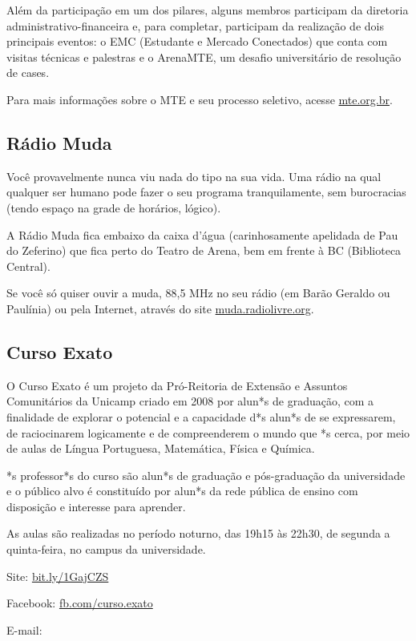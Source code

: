 Além da participação em um dos pilares, alguns membros participam da diretoria
administrativo-financeira e, para completar, participam da realização de dois
principais eventos: o EMC (Estudante e Mercado Conectados) que conta com visitas
técnicas e palestras e o ArenaMTE, um desafio universitário de resolução de
cases.

Para mais informações sobre o MTE e seu processo seletivo, acesse
\url{mte.org.br}.

\subsection{Rádio Muda}

Você provavelmente nunca viu nada do tipo na sua vida. Uma rádio na qual
qualquer ser humano pode fazer o seu programa tranquilamente, sem burocracias
(tendo espaço na grade de horários, lógico).

A Rádio Muda fica embaixo da caixa d'água (carinhosamente apelidada de Pau do
Zeferino) que fica perto do Teatro de Arena, bem em frente à BC (Biblioteca
Central).

Se você só quiser ouvir a muda, 88,5 MHz no seu rádio (em Barão Geraldo ou
Paulínia) ou pela Internet, através do site \url{muda.radiolivre.org}.

\subsection{Curso Exato}

O Curso Exato é um projeto da Pró-Reitoria de Extensão e Assuntos Comunitários
da Unicamp criado em 2008 por alun*s de graduação, com a finalidade de explorar
o potencial e a capacidade d*s alun*s de se expressarem, de raciocinarem
logicamente e de compreenderem o mundo que *s cerca, por meio de aulas de Língua
Portuguesa, Matemática, Física e Química.

*s professor*s do curso são alun*s de graduação e pós-graduação da universidade
e o público alvo é constituído por alun*s da rede pública de ensino com
disposição e interesse para aprender.

As aulas são realizadas no período noturno, das 19h15 às 22h30, de segunda a
quinta-feira, no campus da universidade.

\begin{compactitemize}
    \item Site: \url{bit.ly/1GajCZS}
    \item Facebook: \url{fb.com/curso.exato}
    \item E-mail: 
\end{compactitemize}

